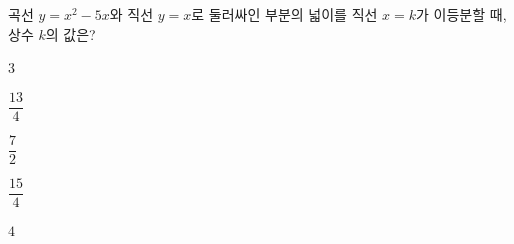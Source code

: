 곡선 $y=x^2-5x$와 직선 $y=x$로 둘러싸인 부분의 넓이를 직선 $x=k$가 이등분할 때, 상수 $k$의 값은?
\begin{choices32}{\rule[-3ex]{0pt}{8ex}$3$}{\rule[-3ex]{0pt}{8ex}$\dfrac{13}{4}$}{\rule[-3ex]{0pt}{8ex}$\dfrac{7}{2}$}{\rule[-3ex]{0pt}{8ex}$\dfrac{15}{4}$}{\rule[-3ex]{0pt}{8ex}$4$}\end{choices32}
